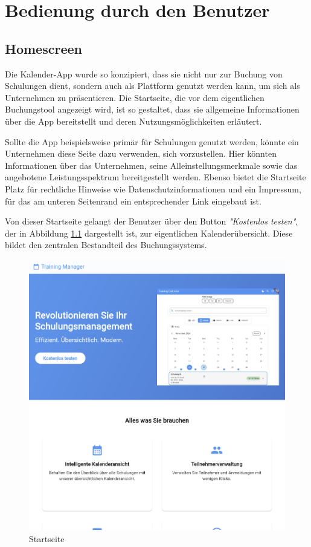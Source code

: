 \chapter{Bedienung durch den Benutzer}
\section{Homescreen}
Die Kalender-App wurde so konzipiert, dass sie nicht nur zur Buchung von Schulungen dient, sondern auch als Plattform genutzt werden
kann, um sich als Unternehmen zu präsentieren. Die Startseite, die vor dem eigentlichen Buchungstool angezeigt wird, ist so gestaltet,
dass sie allgemeine Informationen über die App bereitstellt und deren Nutzungsmöglichkeiten erläutert. 

Sollte die App beispielsweise primär für Schulungen genutzt werden, könnte ein Unternehmen diese Seite dazu verwenden, sich 
vorzustellen. Hier könnten Informationen über das Unternehmen, seine Alleinstellungsmerkmale sowie das angebotene Leistungsspektrum 
bereitgestellt werden. Ebenso bietet die Startseite Platz für rechtliche Hinweise wie Datenschutzinformationen und ein Impressum,
für das am unteren Seitenrand ein entsprechender Link eingebaut ist.

Von dieser Startseite gelangt der Benutzer über den Button \textit{"Kostenlos testen"}, der in Abbildung \ref{HomeBE} dargestellt ist,
zur eigentlichen Kalenderübersicht. Diese bildet den zentralen Bestandteil des Buchungssystems.


\begin{figure}[htbp!]
        \centering
        \includegraphics[scale=0.19]{img/flutter_31.png}
        \caption{Startseite}
        \label{HomeBE}
    \end{figure}

